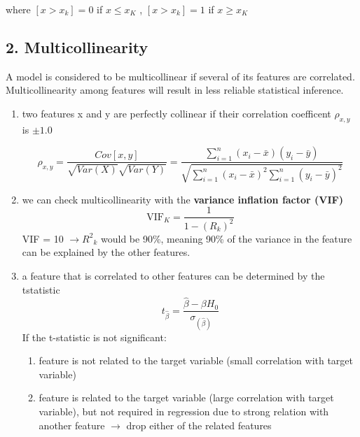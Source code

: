 \documentclass{article}
\begin{document}
where $[x > x_k] = 0$ if $ x \leq x_K$ , $[x > x_k] = 1$ if $ x \geq x_K$


\subsection*{2. Multicollinearity}
A model is considered to be multicollinear if several of its features are correlated.
Multicollinearity among features will result in less reliable statistical inference.

\begin{enumerate}
    \item two features x and y are perfectly collinear if their correlation coefficent $\rho_{x, y}$ is $\pm 1.0$ 

\begin{equation}
\rho_{x,y} = \frac{Cov[x,y]}{\sqrt{Var(X)}{\sqrt{Var(Y)}}} = \frac{\sum_{i=1}^n (x_i - \bar{x})(y_i - \bar{y})}{\sqrt{\sum_{i=1}^n (x_i - \bar{x})^2 \sum_{i=1}^n (y_i - \bar{y})^2}}
\end{equation}

\item we can check multicollinearity with the \textbf{variance inflation factor (VIF)}
\begin{equation} \text{VIF}_K = \frac{1}{1-{(R_{k})}^2} \end{equation}
VIF = 10 $\rightarrow {R^2}_k$ would be 90\%, meaning 90\% of the variance in the feature can be explained by the other features.
\item a feature that is correlated to other features can be determined by the tstatistic
\begin{equation} t_{\hat{\beta}} = \frac{\hat{\beta} - \beta{H_0}}{\sigma_{(\hat{\beta})}} \end{equation} 
If the t-statistic is not significant:
\begin{enumerate}
    \item feature is not related to the target variable (small correlation with target variable)
    \item feature is related to the target variable (large correlation with target variable), but not required in
    regression due to strong relation with another feature $\rightarrow$ drop either of the related features
\end{enumerate}
\end{enumerate}
\end{document}
